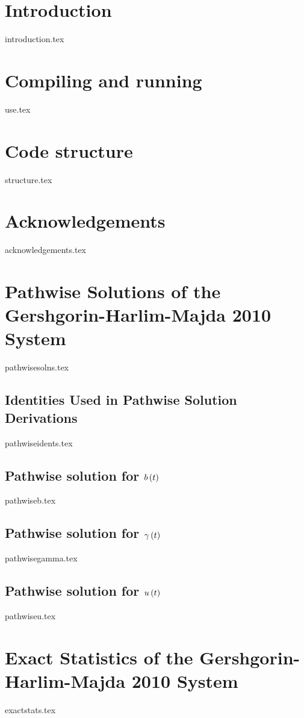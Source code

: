 \documentclass[letterpaper, 12pt]{article}
\begin{document}
\heading

\newpage

\tableofcontents

\newpage

\section{Introduction}
    {introduction.tex}
    
\section{Compiling and running}
	{use.tex}

\section{Code structure}
	{structure.tex}

\section*{Acknowledgements}
	{acknowledgements.tex}
    
\newpage
    
\clearpage
{}



\appendix
	\section{Pathwise Solutions of the Gershgorin-Harlim-Majda 2010 System}
		{pathwisesolns.tex}
		\subsection{Identities Used in Pathwise Solution Derivations}
			{pathwiseidents.tex}
		\subsection{Pathwise solution for $b \left( t \right)$} \label{app:pathwise_b}
			{pathwiseb.tex}
		\subsection{Pathwise solution for $\gamma \left( t \right)$}
			{pathwisegamma.tex}
		\subsection{Pathwise solution for $u \left( t \right)$}
			{pathwiseu.tex}
	
	\section{Exact Statistics of the Gershgorin-Harlim-Majda 2010 System}
		{exactstats.tex}
\end{document}
